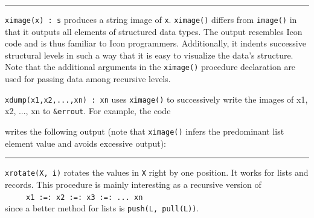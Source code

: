 \vspace{0.25cm}\hrule{}

\texttt{ximage(x) : s} produces a string image of \texttt{x}.
\texttt{ximage()} differs from \texttt{image()} in that it outputs all
elements of structured data types. The output
resembles Icon code and is thus familiar to Icon programmers.
Additionally, it indents successive structural levels in such a way
that it is easy to visualize the data's structure.
Note that the additional arguments in the \texttt{ximage()} procedure
declaration are used for passing data among recursive levels. 

\texttt{xdump(x1,x2,...,xn) : xn} uses \texttt{ximage()} to successively
write the images of x1, x2, ..., xn to \texttt{\&errout}. For example,
the code


\noindent
writes the following output (note that \texttt{ximage()} infers the
predominant list element value and avoids excessive output):



\vspace{0.25cm}\hrule{}

\texttt{xrotate(X, i)} rotates the values in \texttt{X} right by one
position. It works for lists and records. This procedure is mainly
interesting as a recursive version of\\
 \ \ \ \ \ \texttt{x1 :=: x2 :=: x3 :=: ... xn\\
}since a better method for lists is \texttt{push(L, pull(L))}. 


